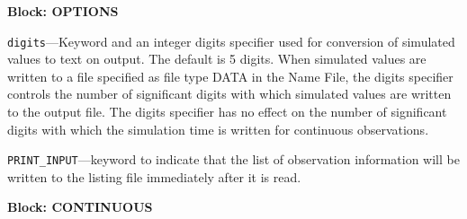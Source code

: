 
\item \textbf{Block: OPTIONS}

\begin{description}
\item \texttt{digits}---Keyword and an integer digits specifier used for conversion of simulated values to text on output. The default is 5 digits. When simulated values are written to a file specified as file type DATA in the Name File, the digits specifier controls the number of significant digits with which simulated values are written to the output file. The digits specifier has no effect on the number of significant digits with which the simulation time is written for continuous observations.

\item \texttt{PRINT\_INPUT}---keyword to indicate that the list of observation information will be written to the listing file immediately after it is read.

\end{description}
\item \textbf{Block: CONTINUOUS}

